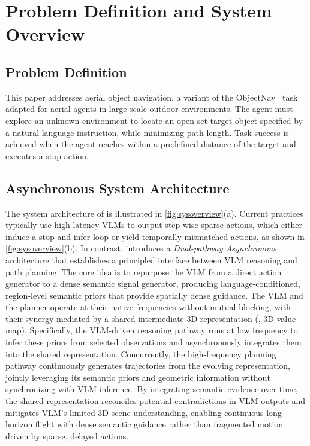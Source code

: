 
\section{Problem Definition and System Overview}

\subsection{Problem Definition}
This paper addresses aerial object navigation, a variant of the ObjectNav~\cite{batra2020objectnav} task adapted for aerial agents in large-scale outdoor environments. The agent must explore an unknown environment to locate an open-set target object specified by a natural language instruction, while minimizing path length. Task success is achieved when the agent reaches within a predefined distance of the target and executes a stop action.


\subsection{Asynchronous System Architecture}
The system architecture of \sysname is illustrated in \fig\ref{fig:sysoverview}(a). Current practices typically use high-latency VLMs to output step-wise sparse actions, which either induce a stop-and-infer loop or yield temporally mismatched actions, as shown in \fig\ref{fig:sysoverview}(b).
In contrast, \sysname introduces a \textit{Dual-pathway Asynchronous} architecture that establishes a principled interface between VLM reasoning and path planning. 
The core idea is to repurpose the VLM from a direct action generator to a dense semantic signal generator, producing language-conditioned, region-level semantic priors that provide spatially dense guidance.
The VLM and the planner operate at their native frequencies without mutual blocking, with their synergy mediated by a shared intermediate 3D representation (\ie, 3D value map). 
Specifically, the VLM-driven reasoning pathway runs at low frequency to infer these priors from selected observations and asynchronously integrates them into the shared representation. 
Concurrently, the high-frequency planning pathway continuously generates trajectories from the evolving representation, jointly leveraging its semantic priors and geometric information without synchronizing with VLM inference. 
By integrating semantic evidence over time, the shared representation reconciles potential contradictions in VLM outputs and mitigates VLM's limited 3D scene understanding, enabling continuous long-horizon flight with dense semantic guidance rather than fragmented motion driven by sparse, delayed actions.



